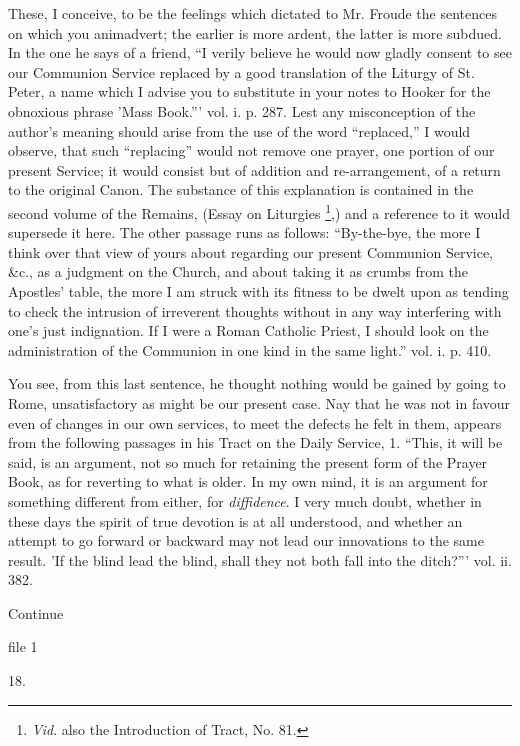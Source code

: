 These, I conceive, to be the feelings which
dictated to Mr. Froude the sentences on which you animadvert; the
earlier is more ardent, the latter is more subdued. In the one he says
of a friend, ``I verily believe he would now gladly consent to see
our Communion Service replaced by a good translation of the Liturgy of
St. Peter, a name which I advise you to substitute in your notes to
Hooker for the obnoxious phrase 'Mass Book.''' vol. i. p. 287. Lest
any misconception of the author's meaning should arise from the use
of the word ``replaced,'' I would observe, that such ``replacing'' would not remove one prayer, one portion of our
present Service; it would consist but of addition and
re-arrangement, of a return to the original Canon. The substance of
this explanation is contained in the second volume of the Remains,
(Essay on Liturgies \footnote{\emph{Vid}.
also the Introduction of Tract, No. 81.},) and a reference to it would supersede
it here. The other passage runs as follows: ``By-the-bye, the more I
think over that view of yours about regarding our present Communion
Service, \&c., as a judgment on the Church, and about taking it as
crumbs from the Apostles' table, the more I am struck with its
fitness to be dwelt upon as tending to check the intrusion of
irreverent thoughts without in any way interfering with one's just
indignation. If I were a Roman Catholic Priest, I should look on the
administration of the Communion in one kind in the same light.'' vol.
i. p. 410.

You see, from this last sentence, he thought
nothing would be gained by going to Rome, unsatisfactory as might be
our present case. Nay that he was not in favour even of changes in our
own services, to meet the defects he felt in them, appears from the
following passages in his Tract on the Daily Service, 1. ``This, it
will be said, is an argument, not so much for retaining the present
form of the Prayer Book, as for reverting to what is older. In my own
mind, it is an argument for something different from either, for \emph{diffidence}.
I very much doubt, whether in these days the spirit of true devotion
is at all understood, and whether an attempt to go forward or backward
may not lead our innovations to the same result. 'If the blind lead
the blind, shall they not both fall into the ditch?''' vol. ii. 382.

Continue

\xsection{[A Letter \&c.]}

file 1

18.

